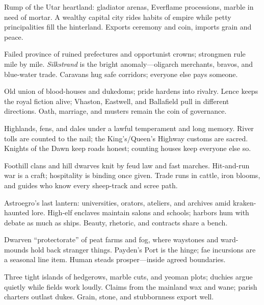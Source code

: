 \documentclass[11pt]{book}
\begin{document}
\begin{description}[leftmargin=2.2cm]
  \item[Ecktoria] Rump of the Utar heartland: gladiator arenas, Everflame processions, marble in need of mortar. A wealthy capital city rides habits of empire while petty principalities fill the hinterland. Exports ceremony and coin, imports grain and peace.

  \item[Acasia] Failed province of ruined prefectures and opportunist crowns; strongmen rule mile by mile. \emph{Silkstrand} is the bright anomaly—oligarch merchants, bravos, and blue-water trade. Caravans hug safe corridors; everyone else pays someone.

  \item[Vhasia] Old union of blood-houses and dukedoms; pride hardens into rivalry. Lence keeps the royal fiction alive; Vhaston, Eastwell, and Ballafield pull in different directions. Oath, marriage, and musters remain the coin of governance.

  \item[Viterra] Highlands, fens, and dales under a lawful temperament and long memory. River tolls are counted to the nail; the King’s/Queen’s Highway customs are sacred. Knights of the Dawn keep roads honest; counting houses keep everyone else so.

  \item[Ubral] Foothill clans and hill dwarves knit by feud law and fast marches. Hit-and-run war is a craft; hospitality is binding once given. Trade runs in cattle, iron blooms, and guides who know every sheep-track and scree path.

  \item[Thepyrgos] Astroegro’s last lantern: universities, orators, ateliers, and archives amid kraken-haunted lore. High-elf enclaves maintain salons and schools; harbors hum with debate as much as ships. Beauty, rhetoric, and contracts share a bench.

  \item[Mistlands] Dwarven “protectorate” of peat farms and fog, where waystones and ward-mounds hold back stranger things. Payden’s Port is the hinge; fae incursions are a seasonal line item. Human steads prosper—inside agreed boundaries.

  \item[Theona] Three tight islands of hedgerows, marble cuts, and yeoman plots; duchies argue quietly while fields work loudly. Claims from the mainland wax and wane; parish charters outlast dukes. Grain, stone, and stubbornness export well.


\end{description}
\end{document}
